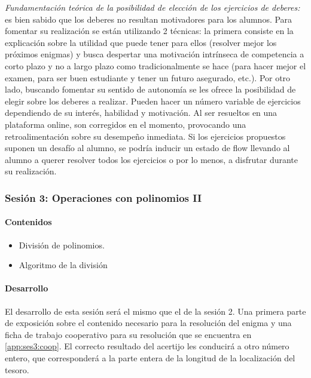 \textit{
	Fundamentación teórica de la posibilidad de elección de los ejercicios de deberes:} 
	es bien sabido que los deberes no resultan motivadores para los alumnos. 
	Para fomentar su realización se están utilizando 2 técnicas: 
	la primera consiste en la explicación sobre la utilidad que puede tener para ellos (resolver mejor los próximos enigmas) y busca despertar una motivación intrínseca de competencia a corto plazo y no a largo plazo como tradicionalmente se hace (para hacer mejor el examen, para ser buen estudiante y tener un futuro asegurado, etc.).
	Por otro lado, buscando fomentar su sentido de autonomía se les ofrece la posibilidad de elegir sobre los deberes a realizar. 
	Pueden hacer un número variable de ejercicios dependiendo de su interés, habilidad y motivación.
	Al ser resueltos en una plataforma online, son corregidos en el momento, provocando una retroalimentación sobre su desempeño inmediata.
	Si los ejercicios propuestos suponen un desafío al alumno, se podría inducir un estado de flow llevando al alumno a querer resolver todos los ejercicios o por lo menos, a disfrutar durante su realización.



\subsubsection{Sesión 3: Operaciones con polinomios II}

\paragraph{Contenidos}
\begin{itemize}
	\item División de polinomios.
	\item Algoritmo de la división
\end{itemize}

\paragraph{Desarrollo}

El desarrollo de esta sesión será el mismo que el de la sesión 2.
%
Una primera parte de exposición sobre el contenido necesario para la resolución del enigma y una ficha de trabajo cooperativo para su resolución que se encuentra en \ref{app:ses3:coop}.
%
El correcto resultado del acertijo les conducirá a otro número entero, que corresponderá a la parte entera de la longitud de la localización del tesoro.

